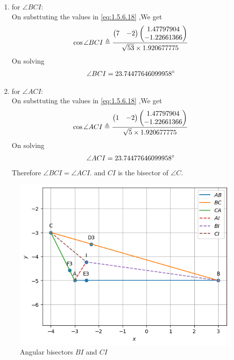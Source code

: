 \documentclass[11pt]{book}
\begin{document}
\begin{enumerate}[label=\thesection.\arabic*.,ref=\thesection.\theenumi]
\begin{enumerate}
\begin{enumerate}
    \item for $\angle BCI$: \\
    On substtuting the values in  \eqref{eq:1.5.6.18} ,We get 
    \begin{align}
        \cos{\angle BCI} \triangleq \frac{\begin{pmatrix} 7 & -2\end{pmatrix}\begin{pmatrix}1.47797904 \\ -1.22661366\end{pmatrix}}{ \sqrt{53} \times 1.920677775} \\
    \end{align}
    On solving 
    \begin{align}
        \angle BCI = 23.74477646099958 \degree
    \end{align}
       \item for $\angle ACI$: \\
    On substtuting the values in  \eqref{eq:1.5.6.18} ,We get 
    \begin{align}
        \cos{\angle ACI} \triangleq \frac{\begin{pmatrix} 1 & -2\end{pmatrix}\begin{pmatrix}1.47797904 \\ -1.22661366\end{pmatrix}}{ \sqrt{5} \times 1.920677775} \\
    \end{align}
    On solving 
    \begin{align}
        \angle ACI = 23.74477646099958 \degree
    \end{align}
    Therefore $\angle BCI = \angle ACI.$ and $CI$ is the bisector of $\angle C$. 
\end{enumerate}
\begin{figure}[H]
    \centering
    \includegraphics{figs/Ang_bisect5.png}
    \caption{Angular bisectors  $BI$ and $CI$}
    \label{fig:Ang_bisect5}
\end{figure}
\end{enumerate}

\end{enumerate}
\end{document}
